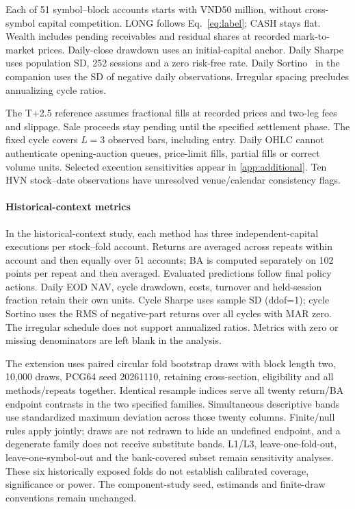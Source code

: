 Each of 51 symbol--block accounts starts with VND50 million, without cross-symbol capital competition. LONG follows Eq.~\ref{eq:label}; CASH stays flat. Wealth includes pending receivables and residual shares at recorded mark-to-market prices. Daily-close drawdown uses an initial-capital anchor. Daily Sharpe~\cite{sharpe1966mutual} uses population SD, 252 sessions and a zero risk-free rate. Daily Sortino~\cite{sortino1994downside} in the companion uses the SD of negative daily observations. Irregular spacing precludes annualizing cycle ratios.

The T+2.5 reference assumes fractional fills at recorded prices and two-leg fees and slippage. Sale proceeds stay pending until the specified settlement phase. The fixed cycle covers \(L=3\) observed bars, including entry. Daily OHLC cannot authenticate opening-auction queues, price-limit fills, partial fills or correct volume units. Selected execution sensitivities appear in \ref{app:additional}. Ten HVN stock--date observations have unresolved venue/calendar consistency flags.

\paragraph{Historical-context metrics}
In the historical-context study, each method has three independent-capital executions per stock--fold account. Returns are averaged across repeats within account and then equally over 51 accounts; BA is computed separately on 102 points per repeat and then averaged. Evaluated predictions follow final policy actions. Daily EOD NAV, cycle drawdown, costs, turnover and held-session fraction retain their own units. Cycle Sharpe uses sample SD (ddof=1); cycle Sortino uses the RMS of negative-part returns over all cycles with MAR zero. The irregular schedule does not support annualized ratios. Metrics with zero or missing denominators are left blank in the analysis.

The extension uses paired circular fold bootstrap draws with block length two, 10,000 draws, PCG64 seed 20261110, retaining cross-section, eligibility and all methods/repeats together. Identical resample indices serve all twenty return/BA endpoint contrasts in the two specified families. Simultaneous descriptive bands use standardized maximum deviation across those twenty columns. Finite/null rules apply jointly; draws are not redrawn to hide an undefined endpoint, and a degenerate family does not receive substitute bands. L1/L3, leave-one-fold-out, leave-one-symbol-out and the bank-covered subset remain sensitivity analyses. These six historically exposed folds do not establish calibrated coverage, significance or power. The component-study seed, estimands and finite-draw conventions remain unchanged.

